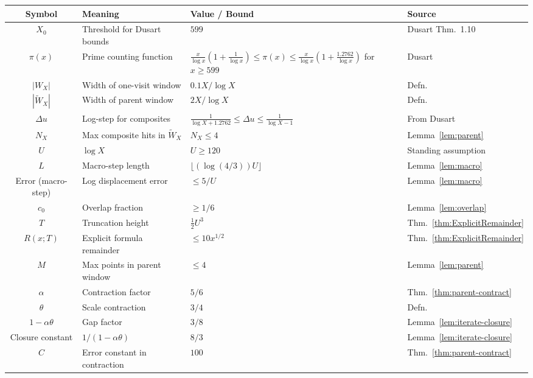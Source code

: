 \documentclass[11pt]{article}
\theoremstyle{plain}
\theoremstyle{definition}
\theoremstyle{remark}
\begin{document}
\begin{center}
\renewcommand{\arraystretch}{1.2} %
\begin{tabularx}{\textwidth}{|c|X|X|X|}
\hline
Symbol & Meaning & Value / Bound & Source \\
\hline
$X_0$ & Threshold for Dusart bounds & $599$ & Dusart Thm.~1.10 \\
\hline
$\pi(x)$ & Prime counting function & 
$\tfrac{x}{\log x}\!\left(1+\tfrac{1}{\log x}\right) \leq \pi(x) \leq \tfrac{x}{\log x}\!\left(1+\tfrac{1.2762}{\log x}\right)$ for $x\geq 599$ 
& Dusart \\
\hline
$|W_X|$ & Width of one-visit window & $0.1X/\log X$ & Defn. \\
\hline
$|\widetilde W_X|$ & Width of parent window & $2X/\log X$ & Defn. \\
\hline
$\Delta u$ & Log-step for composites & 
$\tfrac{1}{\log X+1.2762} \leq \Delta u \leq \tfrac{1}{\log X-1}$ 
& From Dusart \\
\hline
$N_X$ & Max composite hits in $\widetilde W_X$ & $N_X \leq 4$ & Lemma~\ref{lem:parent} \\
\hline
$U$ & $\log X$ & $U\geq 120$ & Standing assumption \\
\hline
$L$ & Macro-step length & $\lfloor (\log(4/3))U \rfloor$ & Lemma~\ref{lem:macro} \\
\hline
Error (macro-step) & Log displacement error & $\leq 5/U$ & Lemma~\ref{lem:macro} \\
\hline
$c_0$ & Overlap fraction & $\geq 1/6$ & Lemma~\ref{lem:overlap} \\
\hline
$T$ & Truncation height & $\tfrac{1}{2}U^3$ & Thm.~\ref{thm:ExplicitRemainder} \\
\hline
$R(x;T)$ & Explicit formula remainder & $\leq 10x^{1/2}$ & Thm.~\ref{thm:ExplicitRemainder} \\
\hline
$M$ & Max points in parent window & $\leq 4$ & Lemma~\ref{lem:parent} \\
\hline
$\alpha$ & Contraction factor & $5/6$ & Thm.~\ref{thm:parent-contract} \\
\hline
$\theta$ & Scale contraction & $3/4$ & Defn. \\
\hline
$1-\alpha\theta$ & Gap factor & $3/8$ & Lemma~\ref{lem:iterate-closure} \\
\hline
Closure constant & $1/(1-\alpha\theta)$ & $8/3$ & Lemma~\ref{lem:iterate-closure} \\
\hline
$C$ & Error constant in contraction & $100$ & Thm.~\ref{thm:parent-contract} \\
\hline
\end{tabularx}
\end{center}
\end{document}
